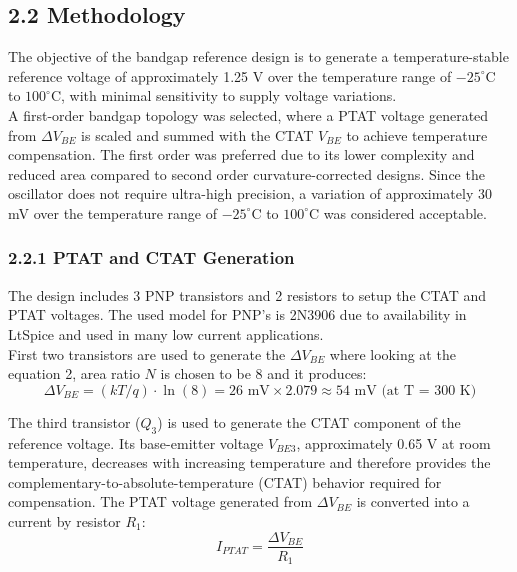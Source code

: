 \documentclass[12pt]{article}
\begin{document}
\subsection*{2.2 Methodology}

The objective of the bandgap reference design is to generate a temperature-stable reference voltage of approximately 1.25 V over the temperature range of $-25^\circ\text{C}$ to $100^\circ\text{C}$, with minimal sensitivity to supply voltage variations. \\
\newline
\noindent
A first-order bandgap topology was selected, where a PTAT voltage generated from $\Delta V_{BE}$ is scaled and summed with the CTAT $V_{BE}$ to achieve temperature compensation. The first order was preferred due to its lower complexity and reduced area compared to second order curvature-corrected designs. Since the oscillator does not require ultra-high precision, a variation of approximately 30 mV over the temperature range of $-25^\circ\text{C}$ to $100^\circ\text{C}$ was considered acceptable.

\subsubsection*{2.2.1 PTAT and CTAT Generation}
The design includes 3 PNP transistors and 2 resistors to setup the CTAT and PTAT voltages. The used model for PNP’s is 2N3906 due to availability in LtSpice and used in many low current applications. \\

First two transistors are used to generate the $\Delta V_{BE}$ where looking at the equation 2, area ratio $N$ is chosen to be 8 and it produces:
\begin{equation*}
\Delta V_{BE} = (kT/q) \cdot \ln(8) = 26 \text{ mV} \times 2.079 \approx 54 \text{ mV (at T = 300 K)}
\end{equation*}

The third transistor ($Q_3$) is used to generate the CTAT component of the reference voltage. Its base-emitter voltage $V_{BE3}$, approximately 0.65 V at room temperature, decreases with increasing temperature and therefore provides the complementary-to-absolute-temperature (CTAT) behavior required for compensation.
The PTAT voltage generated from $\Delta V_{BE}$ is converted into a current by resistor $R_1$:
\begin{equation*}
I_{PTAT} = \frac{\Delta V_{BE}}{R_1}
\end{equation*}
\end{document}
